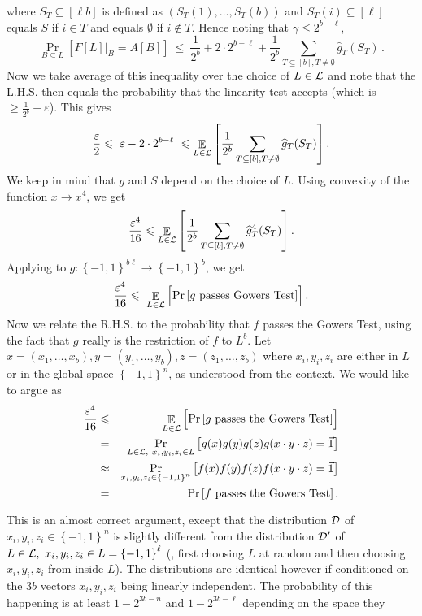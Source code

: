 \documentclass{toc}
\newcommand\set[1]{{\left\{ #1 \right\}}}
\newcommand\Prob[2]{{\Pr_{#1}\left[ {#2} \right]}}
\newcommand\Expect[2]{{\mathop{\mathbb{E}}_{#1}\left[ {#2} \right]}}
\newcommand\cube[1]{ { \set{-1,1}^{#1} } }
\newcommand\eps{\varepsilon}
\renewcommand\geq{\geqslant}
\renewcommand\leq{\leqslant}
\begin{document}
where $S_T \subseteq [\ell b]$ is defined as $(S_T(1), \ldots, S_T(b))$  and  $S_T(i)
\subseteq [\ell]$ equals $S$ if $i \in T$ and equals $\emptyset$ if $i \not\in T$. Hence noting
that $\gamma \leq 2^{b-\ell}$,
 $$ \Prob{B \subseteq L}{F[L]|_B = A[B]}  ~\leq   ~ \frac{1}{2^b} + 2 \cdot 2^{b-\ell}  + \frac{1}{2^b} \sum_{T \subseteq [b], T \neq  \emptyset }  \widehat{g}_T (S_T)\,. $$%
Now we take average of this inequality over the choice of $L \in {\cal L}$ and note that the L.H.S. then equals the probability that the linearity test accepts (which is
~$\geq \frac{1}{2^b}+\eps$). This gives
 $$ \frac{\eps}{2} \leq   ~\eps - 2 \cdot 2^{b-\ell}  ~\leq  \Expect{L \in {\cal L}} { \frac{1}{2^b} \sum_{T \subseteq [b], T \neq  \emptyset }  \widehat{g}_T (S_T) }\,. $$%
We keep in mind that $g$ and $S$ depend on the choice of $L$. Using convexity of the function $x \to x^4$, we get
 $$ \frac{\eps^4}{16} \leq    \Expect{L \in {\cal L}} {  \frac{1}{2^b} \sum_{T \subseteq [b], T \neq  \emptyset }  \widehat{g}^4_T (S_T) }\,.$$%
Applying  to $g: \cube{b\ell} \to \cube{b}$, we get
 $$ \frac{\eps^4}{16} \leq     ~\Expect{L \in {\cal L}}{ \Prob{}{g ~\mbox{passes Gowers Test}  }}\,. $$%
Now we relate the R.H.S. to the probability that $f$ passes the Gowers Test, using the fact that $g$ really is the restriction of
$f$ to $L^b$. Let $x = (x_1,\ldots,x_b), y = (y_1,\ldots,y_b), z= (z_1,\ldots,z_b)$ where $x_i, y_i, z_i$ are either in $L$ or in the global space $\cube{n}$,
as understood from the context. We would like to argue as
\begin{eqnarray*}
  \frac{\eps^4}{16} & \leq &    \Expect{L \in {\cal L}}{ \Prob{}{g ~\mbox{passes
the Gowers Test}  }}\\
 & = &   \Prob{L \in {\cal L}, ~x_i,y_i,z_i \in L}{g(x)g(y)g(z)g(x\cdot y\cdot z) = \vec{1} }\\
 & \approx & \Prob{x_i,y_i,z_i \in \cube{n}}{f(x)f(y)f(z)f(x\cdot y\cdot z) = \vec{1}} \\
 & = & \Prob{}{f ~\mbox{passes the Gowers Test}}\,.%
 \end{eqnarray*}
This is an almost correct argument, except that the distribution ${\cal D}$ of $x_i, y_i, z_i \in \cube{n}$ is slightly different from
the distribution ${\cal D}'$ of $L \in {\cal L}, ~x_i, y_i, z_i \in L = \cube{\ell}$  (\ie, first choosing $L$ at random and then
choosing $x_i, y_i, z_i$ from inside $L$). The distributions are identical however if conditioned on the $3b$ vectors $x_i, y_i, z_i$
being linearly independent. The probability of this happening is at least $1-2^{3b-n}$ and $1-2^{3b-\ell}$ depending on the space they
\end{document}
